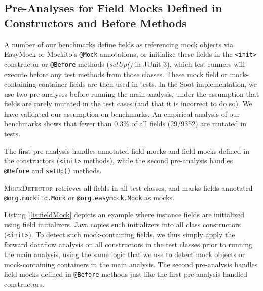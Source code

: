 \subsection{Pre-Analyses for Field Mocks Defined in Constructors and Before Methods}
\label{subsec:pre-analysis}

A number of our benchmarks define fields as referencing mock objects via EasyMock or Mockito's \texttt{@Mock} annotations, or initialize these fields in the \texttt{<init>} constructor or \texttt{@Before} methods (\textit{setUp()} in JUnit 3), which test runners will execute before any test methods from those classes. These mock field or mock-containing container fields are then used in tests. In the Soot implementation, we use two pre-analyses before running the main analysis, under the assumption that fields are rarely mutated in the test cases (and that it is incorrect to do so). We have validated our assumption on benchmarks. An empirical analysis of our benchmarks shows that fewer than 0.3\% of all fields (29/9352) are mutated in tests.

The first pre-analysis handles annotated field mocks and field mocks defined in the constructors (\texttt{<init>} methods), while the second pre-analysis handles \texttt{@Before} and \texttt{setUp()} methods. 

\textsc{MockDetector} retrieves all fields in all test classes, and marks fields annotated {\tt @org.mockito.Mock} or {\tt @org.easymock.Mock} as mocks.

Listing~\ref{lis:fieldMock} depicts an example where instance fields are initialized using field initializers. Java copies such initializers into all class constructors (\texttt{<init>}). To detect such mock-containing fields, we thus simply apply the forward dataflow analysis on all constructors in the test classes prior to running the main analysis, using the same logic that we use to detect mock objects or mock-containing containers in the main analysis. The second pre-analysis handles field mocks defined in \texttt{@Before} methods just like the first pre-analysis handled constructors.



